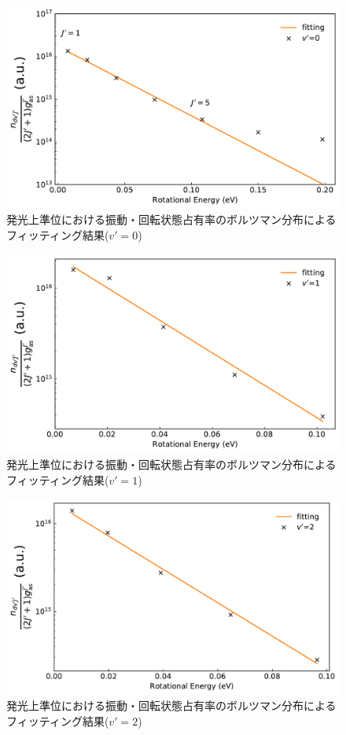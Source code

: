 \begin{figure}
    \centering
    \includegraphics[width=15cm]{pictures/upper-fitting-0.pdf}
    \caption{発光上準位における振動・回転状態占有率のボルツマン分布によるフィッティング結果($v'=0$)}
    \label{fig:upper-fitting-0}
\end{figure}

\begin{figure}
    \centering
    \includegraphics[width=15cm]{pictures/upper-fitting-1.pdf}
    \caption{発光上準位における振動・回転状態占有率のボルツマン分布によるフィッティング結果($v'=1$)}
    \label{fig:upper-fitting-1}
\end{figure}

\begin{figure}
    \centering
    \includegraphics[width=15cm]{pictures/upper-fitting-2.pdf}
    \caption{発光上準位における振動・回転状態占有率のボルツマン分布によるフィッティング結果($v'=2$)}
    \label{fig:upper-fitting-2}
\end{figure}

